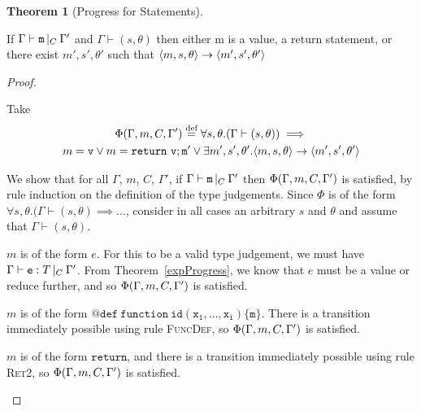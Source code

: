 \documentclass[a4paper]{article}
\theoremstyle{definition}
\theoremstyle{dotless}
\newtheorem{theorem}{Theorem}[section]
\begin{document}
\begin{theorem}[Progress for Statements]\label{statProgress}

  If $\Gamma{}\vdash\mathtt{m}\, |_C \:\Gamma '$ and $\Gamma \vdash (s, \theta)$ then either m is a
  value, a return statement, or there exist $m',s', \theta'$ such that
  $\langle{}m,s,\theta\rangle{}\rightarrow{}\langle{}m',s',\theta'\rangle$

\end{theorem}

\begin{proof}\label{statProgressProof}

  Take 
  \begin{multline*}
  	\Phi(\Gamma, m, C, \Gamma') \stackrel{\text{def}}{=} 
  	\forall s,\theta. (\Gamma \vdash (s,\theta))\implies \\
  	m=\mathtt{v} \vee m=\mathtt{return\ v; m'} \vee
  	\exists m', s',\theta'. \langle{}m,s,\theta\rangle{}\rightarrow{}\langle{}m',s',\theta'\rangle
  \end{multline*}

  We show that for all $\Gamma$, $m$, $C$, $\Gamma'$, if $\Gamma{}\vdash\mathtt{m}\, |_C \:\Gamma '$
  then $\Phi(\Gamma, m, C, \Gamma')$ is satisfied, by rule induction on the definition of the
  type judgements. Since $\Phi$ is of the form
  $\forall s,\theta.(\Gamma\vdash(s,\theta)\implies\dots$,
  consider in all cases an arbitrary $s$ and $\theta$ and assume that $\Gamma\vdash(s,\theta)$.

  \begin{case}[ExpTypable]\label{expTypable}

	$m$ is of the form $e$. For this to be a valid type judgement, we must have
	$\Gamma{}\vdash\mathtt{e}: T\,|_C\:\Gamma'$. From Theorem~\ref{expProgress}, we know that $e$ must be a
	value or reduce further, and so $\Phi(\Gamma, m, C, \Gamma')$ is satisfied.

  \end{case}

  \begin{case}[FunDef]\label{funDef}

	$m$ is of the form $\mathtt{@def\ function\ id(x_1, \dots, x_i)\{m\}}$. There
	is a transition immediately possible using rule \textsc{FuncDef}, so $\Phi(\Gamma, m, C, \Gamma')$
	is satisfied.

  \end{case}

  \begin{case}[RetTypable1]\label{retTypable1}

  	$m$ is of the form $\mathtt{return}$, and there is a transition immediately
  	possible using rule \textsc{Ret2}, so $\Phi(\Gamma, m, C, \Gamma')$ is satisfied. 


\end{case}
\end{proof}
\end{document}
